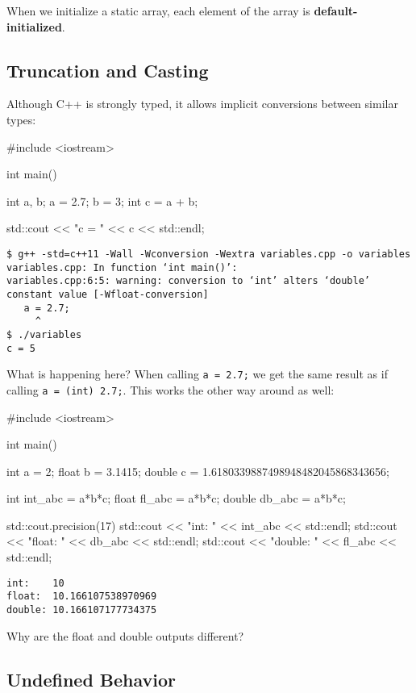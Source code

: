 \documentclass[12pt,letterpaper,twoside]{article}
\begin{document}
When we initialize a static array, each element of the array is \textbf{default-initialized}.


\subsection{Truncation and Casting}

Although C++ is strongly typed, it allows implicit conversions between similar types:
\begin{cpp}
#include <iostream>

int main() {
  int a, b;  
  a = 2.7;    
  b = 3;
  int c = a + b; 

  std::cout << "c = " << c << std::endl;
}
\end{cpp}
\vspace{-3ex}
{\footnotesize
\begin{verbatim}
$ g++ -std=c++11 -Wall -Wconversion -Wextra variables.cpp -o variables
variables.cpp: In function ‘int main()’:
variables.cpp:6:5: warning: conversion to ‘int’ alters ‘double’ constant value [-Wfloat-conversion]
   a = 2.7;
     ^
$ ./variables
c = 5
\end{verbatim}}

What is happening here? When calling \texttt{a = 2.7;} we get the same result as if calling \texttt{a = (int) 2.7;}.  This works the other way around as well:

\begin{cpp}
#include <iostream>

int main() {
  int a = 2;
  float b = 3.1415;
  double c = 1.6180339887498948482045868343656;
  
  int int_abc = a*b*c;
  float fl_abc = a*b*c;
  double db_abc = a*b*c;

  std::cout.precision(17)
  std::cout << "int:    " << int_abc << std::endl;
  std::cout << "float:  " << db_abc << std::endl;
  std::cout << "double: " << fl_abc << std::endl;

}
\end{cpp} 
\vspace{-3ex}
{\footnotesize
\begin{verbatim}
int:    10
float:  10.166107538970969
double: 10.166107177734375
\end{verbatim}}

Why are the float and double outputs different?

\newpage
\subsection{Undefined Behavior}
\end{document}
